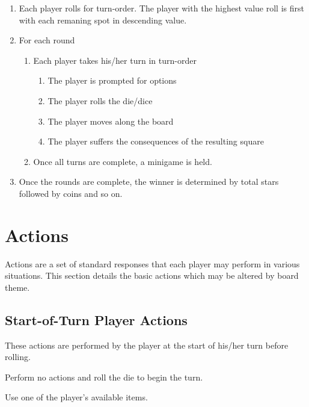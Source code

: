 \documentclass{article}
\begin{document}
\begin{enumerate}
\item Each player rolls for turn-order.  The player with the highest value
roll is first with each remaning spot in descending value.

\item For each round
	\begin{enumerate}
	\item Each player takes his/her turn in turn-order
		\begin{enumerate}
		\item The player is prompted for options
		\item The player rolls the die/dice
		\item The player moves along the board
		\item The player suffers the consequences of the resulting square
		\end{enumerate}
	\item Once all turns are complete, a minigame is held.
	\end{enumerate}

\item Once the rounds are complete, the winner is determined by total stars
followed by coins and so on.
\end{enumerate}

\section{Actions}

Actions are a set of standard responses that each player may perform in various
situations.  This section details the basic actions which may be altered by
board theme.


\subsection{Start-of-Turn Player Actions}

These actions are performed by the player at the start of his/her turn before rolling.

\begin{description}[style=nextline]
\item[Roll] Perform no actions and roll the die to begin the turn.
\item[Use Item] Use one of the player's available items.
\end{description}
\end{document}
